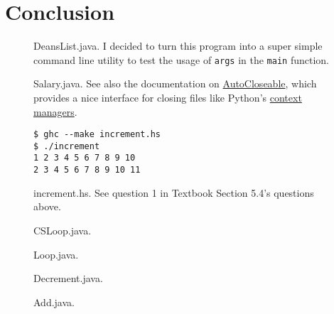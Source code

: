 \documentclass[leqno, 11pt]{article}
\begin{document}
\section*{Conclusion}
\newpage
\begin{figure}
  \centering
  
  \caption{DeansList.java. I decided to turn this program into a super simple command line utility to test the usage of \texttt{args} in the \texttt{main} function.}
  \label{fig:one}
\end{figure}
\begin{figure}
  \centering
  
  \caption{Salary.java. See also the documentation on \href{https://docs.oracle.com/javase/10/docs/api/java/lang/AutoCloseable.html}{AutoCloseable}, which provides a nice interface for closing files like Python's \href{https://docs.python.org/3/reference/compound_stmts.html\#with}{context managers}.}
  \label{fig:two}
\end{figure}
\begin{figure}
  \centering
  
  \begin{verbatim}
$ ghc --make increment.hs
$ ./increment
1 2 3 4 5 6 7 8 9 10
2 3 4 5 6 7 8 9 10 11
  \end{verbatim}
  \caption{increment.hs. See question 1 in Textbook Section 5.4's questions above.}
  \label{fig:four}
\end{figure}
\begin{figure}
  \centering
  
  \caption{CSLoop.java.}
  \label{fig:six}
\end{figure}
\begin{figure}
  \centering
  
  \caption{Loop.java.}
  \label{fig:seven}
\end{figure}
\begin{figure}
  \centering
  
  \caption{Decrement.java.}
  \label{fig:eight}
\end{figure}
\begin{figure}
  \centering
  
  \caption{Add.java.}
  \label{fig:nine}
\end{figure}
\end{document}
